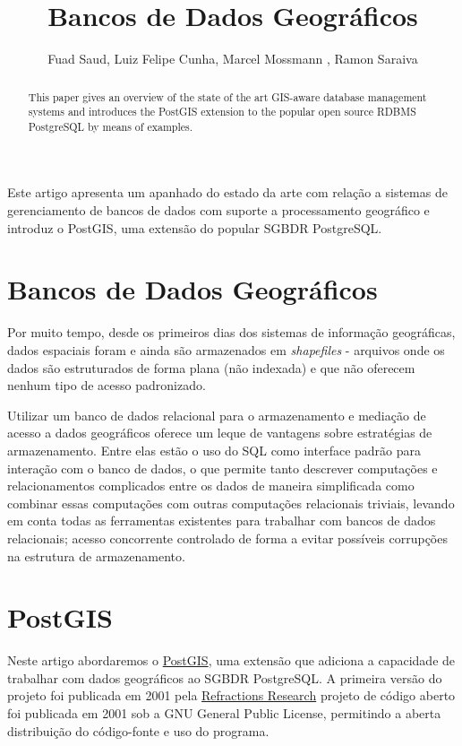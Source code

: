 \documentclass[12pt]{article}
\title{Bancos de Dados Geográficos}
\author{Fuad Saud\inst{1}, Luiz Felipe Cunha\inst{1}, Marcel Mossmann \inst{1}, Ramon Saraiva\inst{1}}
\begin{document}
\maketitle

\begin{abstract}
  This paper gives an overview of the state of the art GIS-aware database
  management systems and introduces the PostGIS extension to the popular
  open source RDBMS PostgreSQL by means of examples.
\end{abstract}

\begin{resumo}
  Este artigo apresenta um apanhado do estado da arte com relação a sistemas de
  gerenciamento de bancos de dados com suporte a processamento geográfico e
  introduz o PostGIS, uma extensão do popular SGBDR PostgreSQL.
\end{resumo}


\section{Bancos de Dados Geográficos}

Por muito tempo, desde os primeiros dias dos sistemas de informação
geográficas, dados espaciais foram e ainda são armazenados em
\textit{shapefiles} - arquivos onde os dados são estruturados de forma plana
(não indexada) e que não oferecem nenhum tipo de acesso padronizado.

Utilizar um banco de dados relacional para o armazenamento e mediação de acesso
a dados geográficos oferece um leque de vantagens sobre estratégias de
armazenamento. Entre elas estão o uso do SQL como interface padrão para
interação com o banco de dados, o que permite tanto descrever computações e
relacionamentos complicados entre os dados de maneira simplificada como
combinar essas computações com outras computações relacionais triviais, levando
em conta todas as ferramentas existentes para trabalhar com bancos de dados
relacionais; acesso concorrente controlado de forma a evitar possíveis
corrupções na estrutura de armazenamento.

\section{PostGIS} \label{sec:firstpage}

Neste artigo abordaremos o \href{http://postgis.net}{PostGIS}, uma
extensão que adiciona a capacidade de trabalhar com dados geográficos ao SGBDR
PostgreSQL. A primeira versão do projeto foi publicada em 2001 pela
\href{http://refractions.net}{Refractions Research} projeto de código aberto
foi publicada em 2001 sob a GNU General Public License, permitindo a aberta
distribuição do código-fonte e uso do programa.
\end{document}
